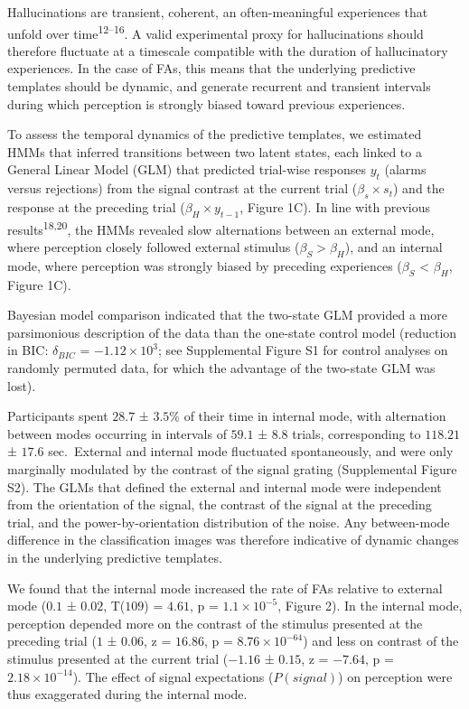 \documentclass[
]{article}
\begin{document}
Hallucinations are transient, coherent, an often-meaningful experiences
that unfold over time\textsuperscript{12--16}. A valid experimental
proxy for hallucinations should therefore fluctuate at a timescale
compatible with the duration of hallucinatory experiences. In the case
of FAs, this means that the underlying predictive templates should be
dynamic, and generate recurrent and transient intervals during which
perception is strongly biased toward previous experiences.

To assess the temporal dynamics of the predictive templates, we
estimated HMMs that inferred transitions between two latent states, each
linked to a General Linear Model (GLM) that predicted trial-wise
responses \(y_t\) (alarms versus rejections) from the signal contrast at
the current trial (\(\beta_s \times s_t\)) and the response at the
preceding trial (\(\beta_H \times y_{t-1}\), Figure 1C). In line with
previous results\textsuperscript{18,20}, the HMMs revealed slow
alternations between an external mode, where perception closely followed
external stimulus (\(\beta_S > \beta_H\)), and an internal mode, where
perception was strongly biased by preceding experiences (\(\beta_S\)
\textless{} \(\beta_H\), Figure 1C).

Bayesian model comparison indicated that the two-state GLM provided a
more parsimonious description of the data than the one-state control
model (reduction in BIC: \(\delta_{BIC}\) =
\(\ensuremath{-1.12\times 10^{3}}\); see Supplemental Figure S1 for
control analyses on randomly permuted data, for which the advantage of
the two-state GLM was lost).

Participants spent \(28.7\) ± \(3.5\)\% of their time in internal mode,
with alternation between modes occurring in intervals of \(59.1\) ±
\(8.8\) trials, corresponding to \(118.21\) ± \(17.6\) sec.~External and
internal mode fluctuated spontaneously, and were only marginally
modulated by the contrast of the signal grating (Supplemental Figure
S2). The GLMs that defined the external and internal mode were
independent from the orientation of the signal, the contrast of the
signal at the preceding trial, and the power-by-orientation distribution
of the noise. Any between-mode difference in the classification images
was therefore indicative of dynamic changes in the underlying predictive
templates.

We found that the internal mode increased the rate of FAs relative to
external mode (\(0.1\) ± \(0.02\), T(\(109\)) = \(4.61\), p =
\(\ensuremath{1.1\times 10^{-5}}\), Figure 2). In the internal mode,
perception depended more on the contrast of the stimulus presented at
the preceding trial (\(1\) ± \(0.06\), z = \(16.86\), p =
\(\ensuremath{8.76\times 10^{-64}}\)) and less on contrast of the
stimulus presented at the current trial (\(-1.16\) ± \(0.15\), z =
\(-7.64\), p = \(\ensuremath{2.18\times 10^{-14}}\)). The effect of
signal expectations (\(P(signal)\)) on perception were thus exaggerated
during the internal mode.
\end{document}
